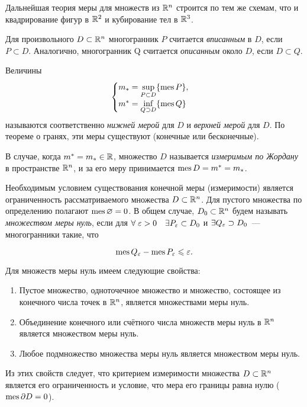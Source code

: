 \documentclass[../../main.tex]{subfiles}
\begin{document}
Дальнейшая теория меры для множеств из $\mathbb{R}^n$ строится по тем же
схемам, что и квадрирование фигур в $\mathbb{R}^2$ и кубирование тел в $\mathbb{R}^3$.

Для произвольного $D \subset \mathbb{R}^n$ многогранник $P$ 
считается \emph{вписанным} в $D$, 
если $P \subset D$. Аналогично, многогранник Q 
считается \emph{описанным} около $D$, если $D \subset Q$.

Величины
\begin{equation}
\begin{cases}
m_* = \underset{P \subset D}{\sup} \{ \operatorname{mes} P \}, \\
m^* = \underset{Q \supset D}{\inf} \{ \operatorname{mes} Q \}
\end{cases}
\end{equation}
называются соответственно \emph{нижней мерой} для $D$ и 
\emph{верхней мерой} для $D$.
По теореме о гранях, эти меры существуют (конечные или бесконечные).

В случае, когда $ m^* = m_* \in \mathbb{R}$,
множество $D$ называется \emph{измеримым по Жордану} в пространстве $\mathbb{R}^n$,
и за его меру принимается $\operatorname{mes} D = m^* = m_*$.

Необходимым условием существования конечной меры (измеримости) 
является ограниченность рассматриваемого множества $D \subset \mathbb{R}^n$. 
Для пустого множества по определению полагают $\operatorname{mes}\varnothing = 0$.
В общем случае, $D_0 \subset \mathbb{R}^n$ будем называть \emph{множеством меры нуль}, 
если для $\forall\; \varepsilon > 0\quad \exists P_\varepsilon \subset D_0$ 
и $\exists Q_\varepsilon \supset D_0$~--- многогранники такие, что

\begin{equation}
\label{614}
\operatorname{mes} Q_\varepsilon - \operatorname{mes} P_\varepsilon \leqslant \varepsilon.
\end{equation}

Для множеств меры нуль имеем следующие свойства:
\begin{enumerate}
	\item Пустое множество, одноточечное множество и множество, 
	состоящее из конечного числа точек в $\mathbb{R}^n$, является множествами меры нуль.
	\item Объединение конечного или счётного числа множеств меры нуль 
	в $\mathbb{R}^n$ является множеством меры нуль.
	\item Любое подмножество множества меры нуль является множеством меры нуль.
\end{enumerate}

Из этих свойств следует, что критерием измеримости множества $D \subset \mathbb{R}^n$ 
является его ограниченность и условие, что мера его границы равна нулю
 ($ \operatorname{mes}\partial D = 0 $).
\end{document}

